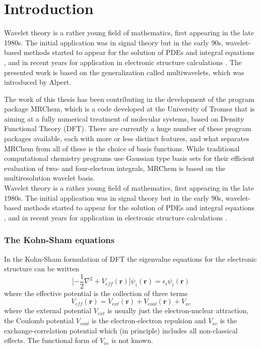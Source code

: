 \chapter{Introduction}
Wavelet theory is a rather young field of mathematics, first appearing in the
late 1980s. The initial application was in signal theory \cite{Strang:1996} but in
the early 90s, wavelet-based methods started to appear for the solution of
PDEs and integral equations \cite{Beylkin90}\cite{Alpert93}, and in recent 
years for application in electronic structure calculations
\cite{Harrison}\cite{Niklasson}\cite{Arias}. The presented work is based on the
generalization called multiwavelets, which was introduced by Alpert\cite{Alpert}.

The work of this thesis has been contributing in the development of the 
program package MRChem, which is a code developed at the University of Tromsø 
\cite{Fossgaard} that is aiming at a fully numerical treatment of molecular 
systems, based on 
Density Functional Theory (DFT). There are currently a huge number of these
program packages available, each with more or less distinct features, and
what separates MRChem from all of these is the choice of basis functions.
While traditional computational chemistry programs use Gaussian type basis sets
for their efficient evaluation of two- and four-electron integrals, MRChem is
based on the multiresolution wavelet basis.\\

\noindent
Wavelet theory is a rather young field of mathematics, first appearing in the
late 1980s. The initial application was in signal theory \cite{Strang} but in
the early 90s, wavelet-based methods started to appear for the solution of
PDEs and integral equations \cite{Beylkin90}\cite{Alpert93}, and in recent 
years for application in electronic structure calculations
\cite{Harrison}\cite{Niklasson}\cite{Arias}.

\subsection*{The Kohn-Sham equations}
In the Kohn-Sham \cite{Kohn-Sham} formulation of DFT the eigenvalue equations 
for the electronic structure can be written
\begin{equation}
	\label{eq:Kohn-Sham}
	\lbrack
	-\frac{1}{2}\nabla^2+V_{eff}(\boldsymbol{r})\rbrack\psi_i(\boldsymbol{r}) =
	\epsilon_i\psi_i(\boldsymbol{r})
\end{equation}
where the effective potential is the collection of three terms
\begin{equation}
	\label{eq:Veff}
	V_{eff}(\boldsymbol{r}) =
	V_{ext}(\boldsymbol{r})+V_{coul}(\boldsymbol{r})+V_{xc}
\end{equation}
where the external potential $V_{ext}$ is usually just the electron-nuclear
attraction, the Coulomb potential $V_{coul}$ is the electron-electron
repulsion and $V_{xc}$ is the exchange-correlation potential which (in
principle) includes all non-classical effects. The functional form of $V_{xc}$
is not known.\\

